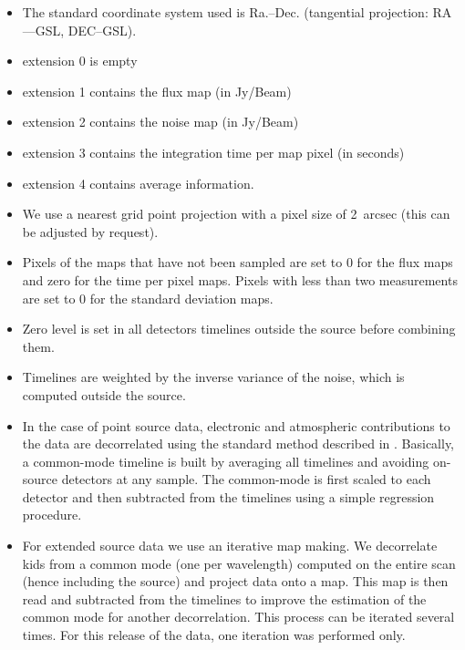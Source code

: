 \documentclass[a4paper,10pt]{article}
\begin{document}
\begin{itemize}
\item The standard coordinate system used is Ra.--Dec. (tangential projection:
  RA---GSL, DEC--GSL).

\item extension 0 is empty
\item extension 1 contains the flux map (in Jy/Beam)
\item extension 2 contains the noise map (in Jy/Beam)
\item extension 3 contains the integration time per map pixel (in seconds)
\item extension 4 contains average information.

\item We use a nearest grid point projection with a pixel size of 2~arcsec
  (this can be adjusted by request). 

\item Pixels of the maps that have not been sampled are set to 0 for the
  flux maps and zero for the time per pixel maps. Pixels with less than two measurements are set to
  0 for the standard deviation maps.

\item Zero level is set in all detectors timelines outside the source before
  combining them.

\item Timelines are weighted by the inverse variance of the noise, which is
  computed outside the source.

\item In the case of point source data, electronic and atmospheric
  contributions to the data are decorrelated using the standard method
  described in \cite{NIKA_abs_calib}. Basically, a common-mode timeline is
  built by averaging all timelines and avoiding on-source detectors at any
  sample.  The common-mode is first scaled to each detector and then
  subtracted from the timelines using a simple regression procedure.

\item For extended source data we use an iterative map making. We decorrelate
  kids from a common mode (one per wavelength) computed on the entire scan
  (hence including the source) and project data onto a map. This map is then
  read and subtracted from the timelines to improve the estimation of the common
  mode for another decorrelation. This process can be iterated several
  times. For this release of the data, one iteration was performed only.

\end{itemize}
\end{document}
